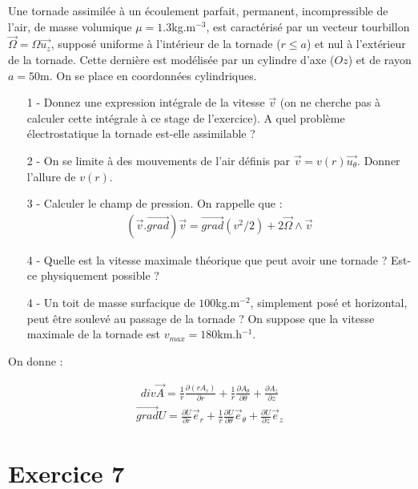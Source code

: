 \documentclass{report}
\begin{document}
Une tornade assimilée à un écoulement parfait, permanent, incompressible de l'air, de masse volumique $\mu = 1.3$kg.m$^{-3}$, est caractérisé par un vecteur tourbillon $\vec{\Omega} = \Omega \vec{u_{z}}$, supposé uniforme à l'intérieur de la tornade ($r\leq a$) et nul à l'extérieur de la tornade. Cette dernière est modélisée par un cylindre d'axe ($Oz$) et de rayon $a=50$m. On se place en coordonnées cylindriques.

\begin{itemize}

	\item[1 - ] Donnez une expression intégrale de la vitesse $\vec{v}$ (on ne cherche pas à calculer cette intégrale à ce stage de l'exercice). A quel problème électrostatique la tornade est-elle assimilable ?
	\item[2 - ] On se limite à des mouvements de l'air définis par $\vec{v} = v(r)\vec{u_{\theta}}$. Donner l'allure de $v(r)$.
	\item[3 - ] Calculer le champ de pression. On rappelle que : 
	\begin{align*}
		(\vec{v}.\vec{grad})\vec{v} =\vec{grad}(v^{2}/2) + 2\vec{\Omega}\wedge \vec{v}
	\end{align*}
	\item[4 - ] Quelle est la vitesse maximale théorique que peut avoir une tornade ? Est-ce physiquement possible ?
	\item[4 - ] Un toit de masse surfacique de $100$kg.m$^{-2}$, simplement posé et horizontal, peut être soulevé au passage de la tornade ? On suppose que la vitesse maximale de la tornade est $v_{max} = 180$km.h$^{-1}$.
\end{itemize}

On donne :

\begin{align*}
	div\vec{A} = \frac{1}{r}\frac{\partial(rA_{r})}{\partial r} +\frac{1}{r}\frac{\partial A_{\theta}}{\partial\theta} + \frac{\partial A_{z}}{\partial z}
\end{align*}
\begin{align*}
	\vec{grad}U = \frac{\partial U}{\partial r}\vec{e}_{r} +\frac{1}{r}\frac{\partial U}{\partial\theta}\vec{e}_{\theta} + \frac{\partial U}{\partial z}\vec{e}_{z}
\end{align*}

\newpage

\section*{Exercice 7}
\end{document}
